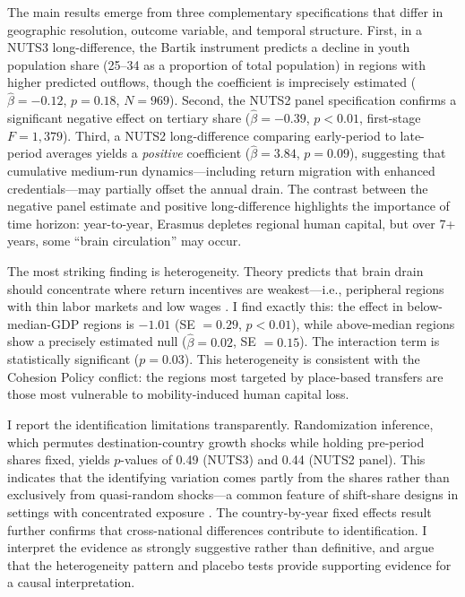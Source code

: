 \documentclass[12pt]{article}
\begin{document}
The main results emerge from three complementary specifications that differ in geographic resolution, outcome variable, and temporal structure. First, in a NUTS3 long-difference, the Bartik instrument predicts a decline in youth population share (25--34 as a proportion of total population) in regions with higher predicted outflows, though the coefficient is imprecisely estimated ($\hat{\beta} = -0.12$, $p = 0.18$, $N = 969$). Second, the NUTS2 panel specification confirms a significant negative effect on tertiary share ($\hat{\beta} = -0.39$, $p < 0.01$, first-stage $F = 1{,}379$). Third, a NUTS2 long-difference comparing early-period to late-period averages yields a \emph{positive} coefficient ($\hat{\beta} = 3.84$, $p = 0.09$), suggesting that cumulative medium-run dynamics---including return migration with enhanced credentials---may partially offset the annual drain. The contrast between the negative panel estimate and positive long-difference highlights the importance of time horizon: year-to-year, Erasmus depletes regional human capital, but over 7+ years, some ``brain circulation'' may occur.

The most striking finding is heterogeneity. Theory predicts that brain drain should concentrate where return incentives are weakest---i.e., peripheral regions with thin labor markets and low wages \citep{borjas_1995, faggian_mccann_2009}. I find exactly this: the effect in below-median-GDP regions is $-1.01$ (SE $= 0.29$, $p < 0.01$), while above-median regions show a precisely estimated null ($\hat{\beta} = 0.02$, SE $= 0.15$). The interaction term is statistically significant ($p = 0.03$). This heterogeneity is consistent with the Cohesion Policy conflict: the regions most targeted by place-based transfers are those most vulnerable to mobility-induced human capital loss.

I report the identification limitations transparently. Randomization inference, which permutes destination-country growth shocks while holding pre-period shares fixed, yields $p$-values of 0.49 (NUTS3) and 0.44 (NUTS2 panel). This indicates that the identifying variation comes partly from the shares rather than exclusively from quasi-random shocks---a common feature of shift-share designs in settings with concentrated exposure \citep{goldsmith_pinkham_sorkin_swift_2020}. The country-by-year fixed effects result further confirms that cross-national differences contribute to identification. I interpret the evidence as strongly suggestive rather than definitive, and argue that the heterogeneity pattern and placebo tests provide supporting evidence for a causal interpretation.
\end{document}
